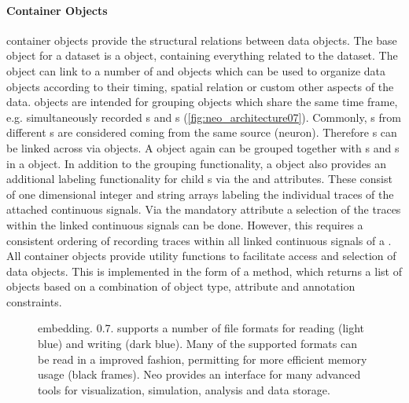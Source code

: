 
\paragraph{Container Objects}
 container objects provide the structural relations between  data objects. The base object for a dataset is a  object, containing everything related to the dataset. The  object can link to a number of  and  objects which can be used to organize data objects according to their timing, spatial relation or custom other aspects of the data.  objects are intended for grouping objects which share the same time frame, e.g. simultaneously recorded s and s (\cref{fig:neo_architecture07}).
Commonly, s from different s are considered coming from the same source (neuron). Therefore s can be linked across  via  objects.
A  object again can be grouped together with s and s in a  object. In addition to the grouping functionality, a  object also provides an additional labeling functionality for child s via the  and  attributes. These consist of one dimensional integer and string arrays labeling the individual traces of the attached continuous signals. Via the mandatory attribute  a selection of the traces within the linked continuous signals can be done. However, this requires a consistent ordering of recording traces within all linked continuous signals of a .
All container objects provide utility functions to facilitate access and selection of data objects. This is implemented in the form of a  method, which returns a list of  objects based on a combination of object type, attribute and annotation constraints.


\begin{figure}
    \centering
    
%     
    \caption[Neo embedding]{ embedding.  0.7. supports a number of file formats for reading (light blue) and writing (dark blue). Many of the supported formats can be read in a improved fashion, permitting for more efficient memory usage (black frames).  Neo provides an interface for many advanced tools for visualization, simulation, analysis and data storage.}
    \label{fig:neo_ios}
\end{figure}


